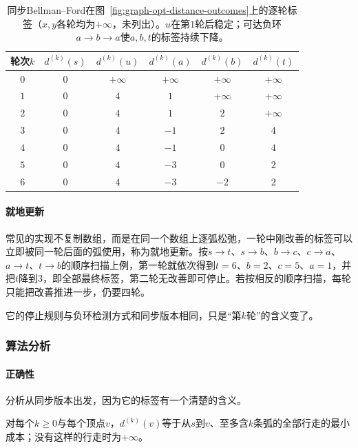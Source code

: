 \begin{table}[!htb]
  \centering
  \caption{同步Bellman--Ford在图~\ref{fig:graph-opt-distance-outcomes}上的逐轮标签（$x,y$各轮均为$+\infty$，未列出）。$u$在第$1$轮后稳定；可达负环$a\to b\to a$使$a,b,t$的标签持续下降。}
  \label{tab:graph-opt-bellman-ford-negative}
  \begin{tabular}{cccccc}
    \toprule
    轮次$k$ & $d^{(k)}(s)$ & $d^{(k)}(u)$ & $d^{(k)}(a)$ & $d^{(k)}(b)$ & $d^{(k)}(t)$ \\
    \midrule
    $0$ & $0$ & $+\infty$ & $+\infty$ & $+\infty$ & $+\infty$ \\
    $1$ & $0$ & $4$ & $1$ & $+\infty$ & $+\infty$ \\
    $2$ & $0$ & $4$ & $1$ & $2$ & $+\infty$ \\
    $3$ & $0$ & $4$ & $-1$ & $2$ & $4$ \\
    $4$ & $0$ & $4$ & $-1$ & $0$ & $4$ \\
    $5$ & $0$ & $4$ & $-3$ & $0$ & $2$ \\
    $6$ & $0$ & $4$ & $-3$ & $-2$ & $2$ \\
    \bottomrule
  \end{tabular}
\end{table}

\paragraph{就地更新}
常见的实现不复制数组，而是在同一个数组上逐弧松弛，一轮中刚改善的标签可以立即被同一轮后面的弧使用，称为就地更新。按$s\to t$、$s\to b$、$b\to c$、$c\to a$、$a\to t$、$t\to b$的顺序扫描上例，第一轮就依次得到$t=6$、$b=2$、$c=5$、$a=1$，并把$t$降到$3$，即全部最终标签，第二轮无改善即可停止。若按相反的顺序扫描，每轮只能把改善推进一步，仍要四轮。

它的停止规则与负环检测方式和同步版本相同，只是“第$k$轮”的含义变了。

\subsubsection{算法分析}

\paragraph{正确性}
分析从同步版本出发，因为它的标签有一个清楚的含义。

\begin{lemma}[同步标签的含义]
\label{lem:graph-opt-bellman-ford-k-arcs}
对每个$k\geq0$与每个顶点$v$，$d^{(k)}(v)$等于从$s$到$v$、至多含$k$条弧的全部行走的最小成本；没有这样的行走时为$+\infty$。
\end{lemma}

